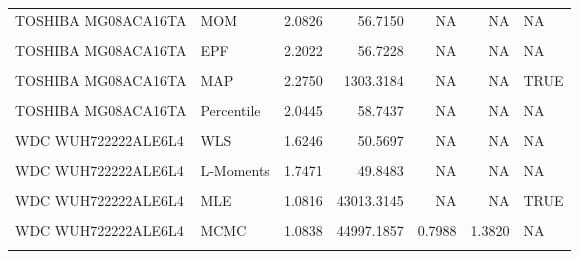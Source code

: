 \documentclass[
]{article}
\begin{document}
\begin{longtable}[t]{llrrrrl}
TOSHIBA MG08ACA16TA & MOM & 2.0826 & 56.7150 & NA & NA & NA\\
\cellcolor{gray!10}{TOSHIBA MG08ACA16TA} & \cellcolor{gray!10}{L-Moments} & \cellcolor{gray!10}{2.0135} & \cellcolor{gray!10}{56.6911} & \cellcolor{gray!10}{NA} & \cellcolor{gray!10}{NA} & \cellcolor{gray!10}{NA}\\
TOSHIBA MG08ACA16TA & EPF & 2.2022 & 56.7228 & NA & NA & NA\\
\cellcolor{gray!10}{TOSHIBA MG08ACA16TA} & \cellcolor{gray!10}{MLE} & \cellcolor{gray!10}{1.2674} & \cellcolor{gray!10}{11837.5483} & \cellcolor{gray!10}{NA} & \cellcolor{gray!10}{NA} & \cellcolor{gray!10}{TRUE}\\
\addlinespace
TOSHIBA MG08ACA16TA & MAP & 2.2750 & 1303.3184 & NA & NA & TRUE\\
\cellcolor{gray!10}{TOSHIBA MG08ACA16TA} & \cellcolor{gray!10}{MCMC} & \cellcolor{gray!10}{1.2643} & \cellcolor{gray!10}{12023.0965} & \cellcolor{gray!10}{1.0010} & \cellcolor{gray!10}{1.5386} & \cellcolor{gray!10}{NA}\\
TOSHIBA MG08ACA16TA & Percentile & 2.0445 & 58.7437 & NA & NA & NA\\
\cellcolor{gray!10}{WDC WUH722222ALE6L4} & \cellcolor{gray!10}{OLS} & \cellcolor{gray!10}{1.5872} & \cellcolor{gray!10}{50.9640} & \cellcolor{gray!10}{NA} & \cellcolor{gray!10}{NA} & \cellcolor{gray!10}{NA}\\
WDC WUH722222ALE6L4 & WLS & 1.6246 & 50.5697 & NA & NA & NA\\
\addlinespace
\cellcolor{gray!10}{WDC WUH722222ALE6L4} & \cellcolor{gray!10}{MOM} & \cellcolor{gray!10}{1.8085} & \cellcolor{gray!10}{49.9389} & \cellcolor{gray!10}{NA} & \cellcolor{gray!10}{NA} & \cellcolor{gray!10}{NA}\\
WDC WUH722222ALE6L4 & L-Moments & 1.7471 & 49.8483 & NA & NA & NA\\
\cellcolor{gray!10}{WDC WUH722222ALE6L4} & \cellcolor{gray!10}{EPF} & \cellcolor{gray!10}{1.8787} & \cellcolor{gray!10}{50.0169} & \cellcolor{gray!10}{NA} & \cellcolor{gray!10}{NA} & \cellcolor{gray!10}{NA}\\
WDC WUH722222ALE6L4 & MLE & 1.0816 & 43013.3145 & NA & NA & TRUE\\
\cellcolor{gray!10}{WDC WUH722222ALE6L4} & \cellcolor{gray!10}{MAP} & \cellcolor{gray!10}{2.5148} & \cellcolor{gray!10}{1189.1086} & \cellcolor{gray!10}{NA} & \cellcolor{gray!10}{NA} & \cellcolor{gray!10}{TRUE}\\
\addlinespace
WDC WUH722222ALE6L4 & MCMC & 1.0838 & 44997.1857 & 0.7988 & 1.3820 & NA\\
\cellcolor{gray!10}{WDC WUH722222ALE6L4} & \cellcolor{gray!10}{Percentile} & \cellcolor{gray!10}{1.9762} & \cellcolor{gray!10}{53.7288} & \cellcolor{gray!10}{NA} & \cellcolor{gray!10}{NA} & \cellcolor{gray!10}{NA}\\*
\end{longtable}
\endgroup{}
\end{document}
